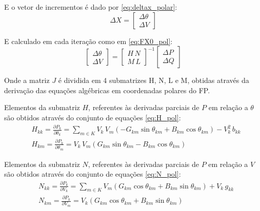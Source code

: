 E o vetor de incrementos é dado por \eqref{eq:deltax_polar}:
\begin{equation}\label{eq:deltax_polar}
    \Delta X = 
    \begin{bmatrix}
    \Delta \theta\\
    \Delta V
    \end{bmatrix}
\end{equation}

E calculado em cada iteração como em \eqref{eq:FX0_pol}:
\begin{equation}\label{eq:FX0_pol}
    \begin{bmatrix}
        \Delta \theta\\
        \Delta V
    \end{bmatrix}
    =
    \begin{bmatrix}
        H\,N\\
        M\,L
    \end{bmatrix}
    ^{-1}
    \begin{bmatrix}
        \Delta P\\
        \Delta Q
    \end{bmatrix}
\end{equation}

Onde a matriz $J$ é dividida em 4 submatrizes H, N, L e M, obtidas através da derivação das equações algébricas em coordenadas polares do \ac{FP}.

Elementos da submatriz $H$, referentes às derivadas parciais de $P$ em relação a $\theta$ são obtidos através do conjunto de equações \eqref{eq:H_pol}:
\begin{equation} \label{eq:H_pol}
    \begin{split}
        &H_{kk} = \frac{\partial P_k}{\partial \theta_k} =
        \sum_{m \in K} V_k\,V_m(-G_{km}\sin{\theta_{km}}+B_{km}\cos{\theta_{km}})-V_k^2\,b_{kk}\\
        &H_{km} = \frac{\partial P_k}{\partial \theta_m} = 
        V_k \, V_m(G_{km}\sin{\theta_{km}} - B_{km}\cos{\theta_{km}})
    \end{split}
\end{equation}

Elementos da submatriz $N$, referentes às derivadas parciais de $P$ em relação a $V$ são obtidos através do conjunto de equações \eqref{eq:N_pol}:
\begin{equation} \label{eq:N_pol}
    \begin{split}
        &N_{kk}=\frac{\partial P_k}{\partial V_k}=
        \sum_{m \in K} V_m(G_{km}\cos{\theta_{km}}+B_{km}\sin{\theta_{km}})+V_k\,g_{kk}\\
        &N_{km} = \frac{\partial P_k}{\partial V_m} = 
        V_k(G_{km}\cos{\theta_{km}} + B_{km}\sin{\theta_{km}})
    \end{split}
\end{equation}

